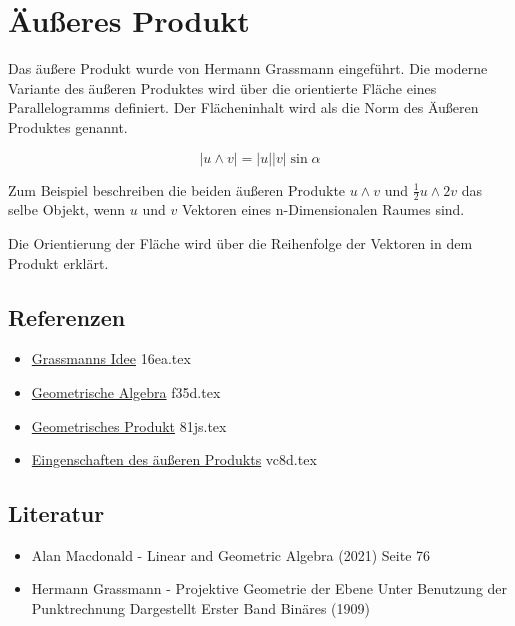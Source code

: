 \documentclass{sajzk}
\begin{document}
\section{Äußeres Produkt} 
\label{fuw3}

Das äußere Produkt wurde von Hermann Grassmann eingeführt. Die moderne Variante des äußeren Produktes wird über die orientierte Fläche eines Parallelogramms definiert. Der Flächeninhalt wird als die Norm des Äußeren Produktes genannt.

$$
|u \wedge v| = |u| |v|\sin\alpha
$$

Zum Beispiel beschreiben die beiden äußeren Produkte $u\wedge v$ und
$\frac{1}{2}u\wedge 2v$ das selbe Objekt, wenn $u$ und $v$ Vektoren eines
n-Dimensionalen Raumes sind.

\begin{center}
\end{center}

Die Orientierung der Fläche wird über die Reihenfolge der Vektoren in dem
Produkt erklärt.
\newpage
\subsection{Referenzen} 
\begin{itemize}
    \item \href{16ea.pdf}{Grassmanns Idee} 16ea.tex
    \item \href{f35d.pdf}{Geometrische Algebra} f35d.tex
    \item \href{81js.pdf}{Geometrisches Produkt} 81js.tex
    \item \href{vc8d.pdf}{Eingenschaften des äußeren Produkts} vc8d.tex
\end{itemize}

\subsection{Literatur} 
\begin{itemize}
    \item Alan Macdonald - Linear and Geometric Algebra (2021) Seite 76
    \item Hermann Grassmann - Projektive Geometrie der Ebene Unter Benutzung der Punktrechnung Dargestellt Erster Band Binäres (1909)
\end{itemize}
\end{document}
